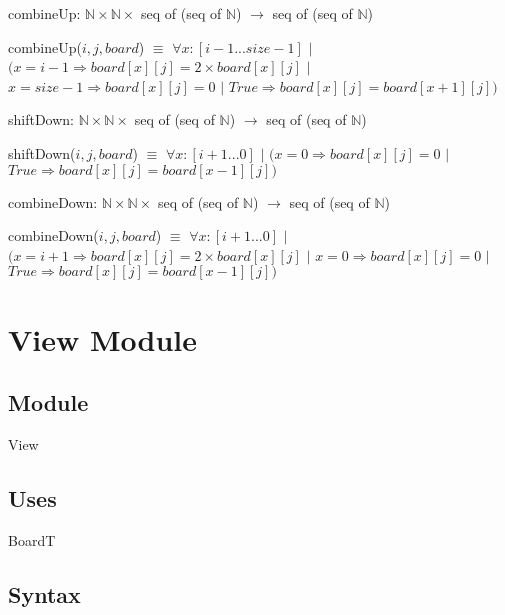 \documentclass[12pt]{article}
\begin{document}
\bigskip
\bigskip

\noindent combineUp: $\mathbb{N} \times \mathbb{N} \times$ seq of (seq of $\mathbb{N}$) $\rightarrow$ seq of (seq of $\mathbb{N}$)

\medskip

\noindent combineUp($i, j, board$) $\equiv$ $\forall x : [i-1...size-1]$ $|$ $(x = i-1 \Rightarrow board[x][j] = 2 \times board[x][j]$ $|$ $x = size-1 \Rightarrow board[x][j] = 0$ $|$ $True \Rightarrow board[x][j] = board[x+1][j])$

\bigskip
\bigskip

\noindent shiftDown: $\mathbb{N} \times \mathbb{N} \times$ seq of (seq of $\mathbb{N}$) $\rightarrow$ seq of (seq of $\mathbb{N}$) 

\medskip

\noindent shiftDown($i, j, board$) $\equiv$ $\forall x : [i+1...0]$ $|$ $(x = 0 \Rightarrow board[x][j] = 0$ $|$ $True \Rightarrow board[x][j] = board[x-1][j])$

\bigskip
\bigskip

\noindent combineDown: $\mathbb{N} \times \mathbb{N} \times$ seq of (seq of $\mathbb{N}$) $\rightarrow$ seq of (seq of $\mathbb{N}$)

\medskip

\noindent combineDown($i, j, board$) $\equiv$ $\forall x : [i+1...0]$ $|$ $(x = i+1 \Rightarrow board[x][j] = 2 \times board[x][j]$ $|$ $x = 0 \Rightarrow board[x][j] = 0$ $|$ $True \Rightarrow board[x][j] = board[x-1][j])$

\bigskip
\bigskip


\newpage

\section* {View Module}

\subsection* {Module}

View

\subsection* {Uses}

BoardT

\subsection* {Syntax}
\end{document}
